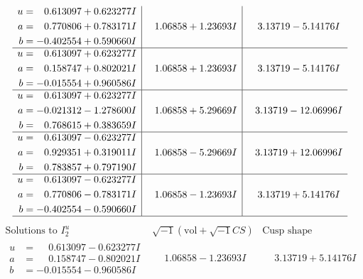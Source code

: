 \documentclass[1p]{elsarticle_modified}
\theoremstyle{definition}
\newcommand{\I}{\sqrt{-1}}
\begin{document}
$$\begin{array}{c|c|c}
\begin{aligned}
u &= \phantom{-}0.613097 + 0.623277 I \\
a &= \phantom{-}0.770806 + 0.783171 I \\
b &= -0.402554 + 0.590660 I\end{aligned}
 & \phantom{-}1.06858 + 1.23693 I & \phantom{-}3.13719 - 5.14176 I \\ \hline\begin{aligned}
u &= \phantom{-}0.613097 + 0.623277 I \\
a &= \phantom{-}0.158747 + 0.802021 I \\
b &= -0.015554 + 0.960586 I\end{aligned}
 & \phantom{-}1.06858 + 1.23693 I & \phantom{-}3.13719 - 5.14176 I \\ \hline\begin{aligned}
u &= \phantom{-}0.613097 + 0.623277 I \\
a &= -0.021312 - 1.278600 I \\
b &= \phantom{-}0.768615 + 0.383659 I\end{aligned}
 & \phantom{-}1.06858 + 5.29669 I & \phantom{-}3.13719 - 12.06996 I \\ \hline\begin{aligned}
u &= \phantom{-}0.613097 - 0.623277 I \\
a &= \phantom{-}0.929351 + 0.319011 I \\
b &= \phantom{-}0.783857 + 0.797190 I\end{aligned}
 & \phantom{-}1.06858 - 5.29669 I & \phantom{-}3.13719 + 12.06996 I \\ \hline\begin{aligned}
u &= \phantom{-}0.613097 - 0.623277 I \\
a &= \phantom{-}0.770806 - 0.783171 I \\
b &= -0.402554 - 0.590660 I\end{aligned}
 & \phantom{-}1.06858 - 1.23693 I & \phantom{-}3.13719 + 5.14176 I\\
 \hline 
 \end{array}$$\newpage$$\begin{array}{c|c|c}  
\text{Solutions to }I^u_{2}& \I (\text{vol} + \sqrt{-1}CS) & \text{Cusp shape}\\
 \hline 
\begin{aligned}
u &= \phantom{-}0.613097 - 0.623277 I \\
a &= \phantom{-}0.158747 - 0.802021 I \\
b &= -0.015554 - 0.960586 I\end{aligned}
 & \phantom{-}1.06858 - 1.23693 I & \phantom{-}3.13719 + 5.14176 I \\ \hline\begin{aligned}

\end{aligned}
\end{array}$$
\end{document}

